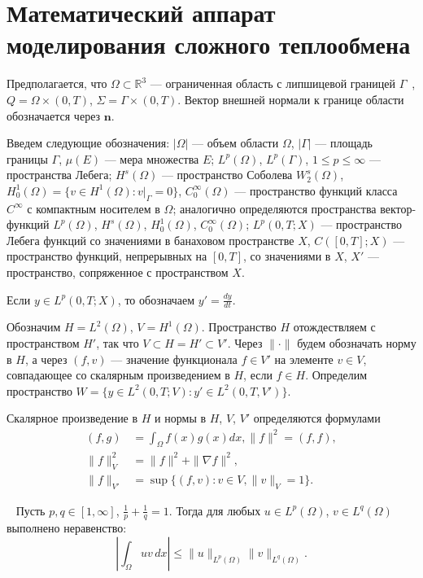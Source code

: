 \section{Математический аппарат моделирования сложного теплообмена}
\label{sec:ch1/sec6}
Предполагается, что $\Omega \subset \mathbb{R}^3$ — ограниченная
область с липшицевой границей $\Gamma$~\cite[с.~232]{Zeidler1986},
$Q = \Omega \times (0, T)$, $\Sigma = \Gamma \times (0, T)$.
Вектор внешней нормали к границе области обозначается через $\mathbf{n}$.

Введем следующие обозначения: $|\Omega|$ — объем области $\Omega$,
$|\Gamma|$ — площадь границы $\Gamma$, $\mu(E)$ — мера множества $E$;
$L^p(\Omega)$, $L^p(\Gamma)$, $1 \le p \le \infty$ — пространства Лебега;
$H^s(\Omega)$ — пространство Соболева $W^{s}_{2}(\Omega)$,
$H^1_0(\Omega) = \{v \in H^1(\Omega) : v|_\Gamma = 0\}$,
$C^\infty_0(\Omega)$ — пространство функций класса $C^\infty$
с компактным носителем в $\Omega$; аналогично определяются пространства
вектор-функций $L^p(\Omega)$, $H^s(\Omega)$, $H^1_0(\Omega)$,
$C^\infty_0(\Omega)$; $L^p(0, T; X)$ — пространство Лебега функций
со значениями в банаховом пространстве $X$, $C([0, T]; X)$ — пространство
функций, непрерывных на $[0, T]$, со значениями в $X$, $X'$ — пространство,
сопряженное с пространством $X$.

Если $y \in L^p(0, T; X)$, то обозначаем $y' = \frac{dy}{dt}$.

Обозначим $H = L^2(\Omega)$, $V = H^1(\Omega)$.
Пространство $H$ отождествляем с пространством $H'$,
так что $V \subset H = H' \subset V'$.
Через $\| \cdot \|$ будем обозначать норму в $H$,
а через $(f, v)$ — значение функционала $f \in V'$ на элементе
$v \in V$, совпадающее со скалярным произведением в $H$,
если $f \in H$.
Определим пространство $W = \{ y \in L^2(0, T; V):
y' \in L^2(0, T, V') \}$.

Скалярное произведение в $H$ и нормы в $H$,
$V$, $V'$ определяются формулами
\begin{align*}
(f, g)
    &= \int_\Omega f(x)g(x) dx, \| f \|^2 = (f, f), \\
    \| f \|^2_{V} &= \| f \|^2 + \| \nabla f \|^2, \\
    \| f \|_{V'} &= \sup \{ (f, v):
    v \in V, \|v\|_{V} = 1 \}.
\end{align*}


\begin{lemma}
    \label{lemma:hoelder}~\cite[с.~35]{Zeidler1990b}
    Пусть $p, q \in [1, \infty]$, $\frac{1}{p} + \frac{1}{q} = 1$.
    Тогда для любых $u \in L^p(\Omega)$, $v \in L^q(\Omega)$
    выполнено неравенство:
    \[
        \left| \int_\Omega uv \, dx \right|
        \le \|u\|_{L^p(\Omega)} \|v\|_{L^q(\Omega)}.
    \]
\end{lemma}

